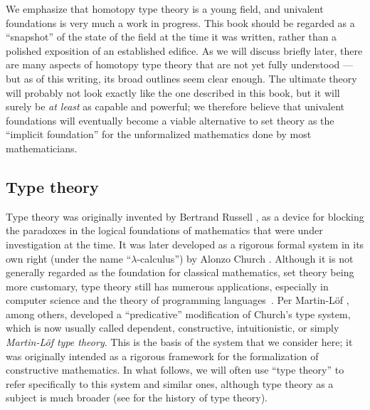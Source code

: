 \OPTwidow

We emphasize that homotopy type theory is a young field, and univalent foundations is very much a work in progress.
This book should be regarded as a ``snapshot'' of the state of the field at the time it was written, rather than a polished exposition of an established edifice.
As we will discuss briefly later, there are many aspects of homotopy type theory that are not yet fully understood --- but as of this writing, its broad outlines seem clear enough.
The ultimate theory will probably not look exactly like the one described in this book, but it will surely be \emph{at least} as capable and powerful; we therefore believe that univalent foundations will eventually become a viable alternative to set theory as the ``implicit foundation'' for the unformalized mathematics done by most mathematicians.

\subsection*{Type theory}

Type theory was originally invented by Bertrand Russell \cite{Russell:1908}, as a device for blocking the paradoxes in the logical foundations of mathematics  that were under investigation at the time. It was later developed as a rigorous formal system in its own right (under the name ``$\lambda$-calculus'') by Alonzo Church \cite{Church:1933cl,Church:1940tu,Church:1941tc}.  Although it is not generally regarded as the foundation for classical mathematics, set theory being more customary, type theory still has numerous applications, especially in computer science and the theory of programming languages~\cite{Pierce-TAPL}.
%
%
%
Per Martin-L\"{o}f \cite{Martin-Lof-1972,Martin-Lof-1973,Martin-Lof-1979,martin-lof:bibliopolis}, among others,
developed a ``predicative'' modification of Church's type system, which is now usually called dependent, constructive, intuitionistic, or simply \emph{Martin\--L\"of type theory}. This is the basis of the system that we consider here; it was originally intended as a rigorous framework for the formalization of constructive mathematics.  In what follows, we will often use ``type theory'' to refer specifically to this system and similar ones, although type theory as a subject is much broader (see \cite{somma,kamar} for the history of type theory).

